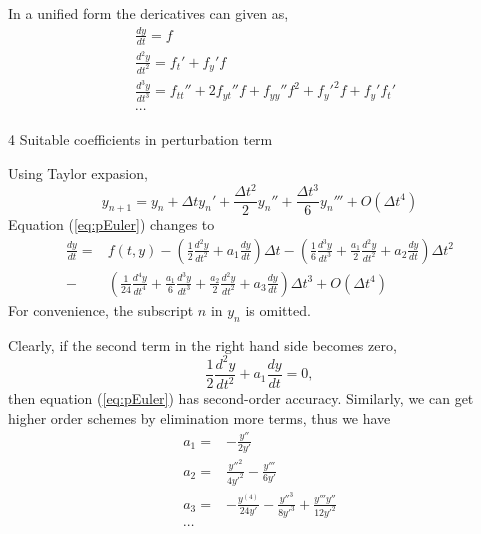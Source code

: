 \documentclass[review]{elsarticle}
\theoremstyle{plain}\newtheorem{definition}{\sc{Definition}}
\theoremstyle{defination}\newtheorem{example}{Example}[section]
\numberwithin{equation}{section}
\numberwithin{table}{section}
\begin{document}
{In a unified form the dericatives can given as,        
\begin{equation}
  \begin{aligned}
  &\frac{dy}{dt} = f\\
  &\frac{d^2y}{dt^2} = f_t'+f_y'f\\
  &\frac{d^3y}{dt^3} = f_{tt}''+2f_{yt}''f+f_{yy}''f^2+{f_y'}^2f+f_y'f_t'\\
  &\cdots
\end{aligned}
\end{equation}

\textcircled{\small {4}} Suitable coefficients in perturbation term

Using Taylor expasion, 
\begin{equation}
  y_{n+1}=y_n + \Delta t y_n' + \frac{\Delta t^2}{2} y_n'' + \frac{\Delta t^3}{6} y_n''' + O(\Delta t^4 )
  \end{equation}
Equation (\ref{eq:pEuler}) changes to
\begin{equation}
  \begin{aligned}
  \frac{dy}{dt}=&f(t,y)-\left(\frac{1}{2}\frac{d^2y}{dt^2}+a_1\frac{dy}{dt}\right)\Delta t - \left( \frac{1}{6}\frac{d^3 y}{dt^3}+\frac{a_1}{2}\frac{d^2y}{dt^2}+a_2\frac{dy}{dt}\right) \Delta t^2 \\
  -&\left(\frac{1}{24}\frac{d^4y}{dt^4}+\frac{a_1}{6}\frac{d^3y}{dt^3}+\frac{a_2}{2}\frac{d^2y}{dt^2}+a_3 \frac{dy}{dt}\right) \Delta t^3 +O(\Delta t^4) 
  \end{aligned}
  \end{equation}
For convenience, the subscript $n$  in  $y_n$ is omitted. 

  Clearly, if the second term in the right hand side becomes zero,
\begin{equation}
  \frac{1}{2}\frac{d^2y}{dt^2}+a_1\frac{dy}{dt}=0,
  \end{equation}
then equation (\ref{eq:pEuler}) has second-order accuracy. Similarly, we can get higher order schemes by elimination more terms, thus we have 
\begin{equation}
  \begin{aligned}
	a_1 =&- \frac{y''}{2y'}\\
	a_2=& \frac{y''^2}{4y'^2}-\frac{y'''}{6y'}\\
	a_3=&-\frac{y^{(4)}}{24y'}-\frac{y''^3}{8y'^3}+\frac{y'''y''}{12y'^2}\\
	\cdots
	\end{aligned}
	\end{equation}

}
\end{document}
